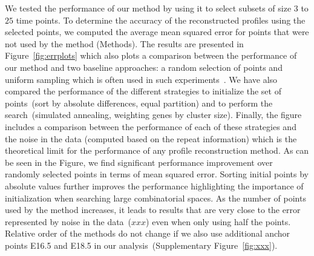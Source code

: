 \documentclass[10pt]{article}
\newcommand{\Tempselect}{\textit{TempSelect}\xspace}
\begin{document}

We tested the performance of our method by using it to select
subsets of size $3$ to $25$ time points. To determine the accuracy of the reconstructed profiles
using the selected points, we computed the average mean squared error for points
that were not used by the method (Methods). The results are
presented in Figure~\ref{fig:errplots} which also plots a
comparison between the performance of our method and two baseline
approaches: a random selection of points and uniform sampling which is
often used in such experiments~\cite{bar2012}. We have also compared the performance of the
different strategies to initialize the set of points~(sort by absolute
differences, equal partition) and to perform the search~(simulated
annealing, weighting genes by cluster size). Finally, the figure includes a comparison between the
performance of each of these strategies and the noise in the data (computed based on the repeat
information) which is the theoretical limit for the performance of
any profile reconstruction method. As can be seen in the Figure, we
find significant performance improvement over randomly selected
points in terms of mean squared error. Sorting initial points by absolute values further improves
the performance highlighting the importance of initialization when
searching large combinatorial spaces. As the number of
points used by the method increases, it leads to results that are very close to the error represented by
noise in the data~($xxx$) even when only using half the points. Relative order of the methods do not change if we also use
additional anchor points E16.5 and E18.5 in our analysis~(Supplementary Figure~\ref{fig:xxx}).
\end{document}
